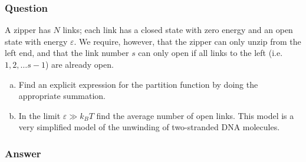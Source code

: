 \subsubsection{Question}

A zipper has $N$ links; each link has a closed state with zero energy and an
open state with energy $\varepsilon $. We require, however, that the zipper can only
unzip from the left end, and that the link number $s$ can only open if all
links to the left (i.e.\ $1, 2, \ldots s-1$) are already open.
\begin{enumerate}[a.]
    \item
        Find an explicit expression for the partition function by doing the
        appropriate summation.
    \item
        In the limit $\varepsilon \gg k_B T$ find the average number of open links. This
        model is a very simplified model of the unwinding of two-stranded
        DNA molecules.
\end{enumerate}

\subsubsection{Answer}

